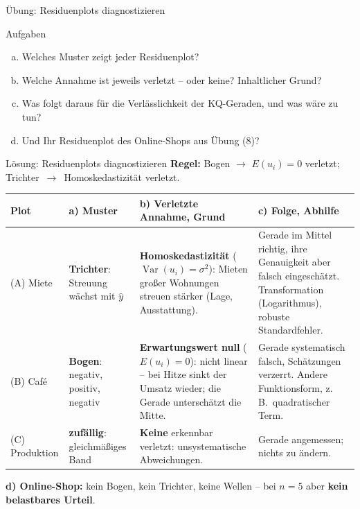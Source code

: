 \documentclass[aspectratio=169,11pt]{beamer}
\begin{document}
\begin{frame}{Übung: Residuenplots diagnostizieren}
\begin{center}
\begin{tikzpicture}
    \end{tikzpicture}
  \end{center}
  \vspace{-4pt}
  \begin{exampleblock}{Aufgaben}
    \begin{enumerate}[a)]
      \setlength{\itemsep}{0pt}
      \item Welches Muster zeigt jeder Residuenplot?
      \item Welche Annahme ist jeweils verletzt -- oder keine? Inhaltlicher Grund?
      \item Was folgt daraus für die Verlässlichkeit der KQ-Geraden, und was wäre zu tun?
      \item Und Ihr Residuenplot des Online-Shops aus Übung (8)?
    \end{enumerate}
  \end{exampleblock}
\end{frame}

\begin{frame}{Lösung: Residuenplots diagnostizieren}
  \small \textbf{Regel:} Bogen $\to$ $E(u_i) = 0$ verletzt; Trichter~$\to$~Homoskedastizität verletzt.\par
  \footnotesize
  \begin{center}
    \renewcommand{\arraystretch}{1.1}
    \begin{tabular}{@{}L{2.2cm} L{2.6cm} L{4.6cm} L{4.4cm}@{}}
      \toprule
      \textbf{Plot} & \textbf{a) Muster} & \textbf{b) Verletzte Annahme, Grund} & \textbf{c) Folge, Abhilfe} \\
      \midrule
      (A) Miete & \textbf{Trichter}: Streuung wächst mit $\hat{y}$
        & \textbf{Homoskedastizität} ($\operatorname{Var}(u_i) = \sigma^{2}$): Mieten
          großer Wohnungen streuen stärker (Lage, Ausstattung).
        & Gerade im Mittel richtig, ihre Genauigkeit aber falsch eingeschätzt.
          Transformation (Logarithmus), robuste Standardfehler. \\ \addlinespace[2pt]
      (B) Café & \textbf{Bogen}: negativ, positiv, negativ
        & \textbf{Erwartungswert null} ($E(u_i) = 0$): nicht linear -- bei Hitze sinkt
          der Umsatz wieder; die Gerade unterschätzt die Mitte.
        & Gerade systematisch falsch, Schätzungen verzerrt.
          Andere Funktionsform, z.\,B.\ quadratischer Term. \\ \addlinespace[2pt]
      (C) Produktion & \textbf{zufällig}: gleichmäßiges Band
        & \textbf{Keine} erkennbar verletzt: unsystematische Abweichungen.
        & Gerade angemessen; nichts zu ändern. \\
      \bottomrule
    \end{tabular}
  \end{center}
  \vspace{-2pt}
  \small \textbf{d) Online-Shop:} kein Bogen, kein Trichter, keine Wellen -- bei $n = 5$
  aber \textbf{kein belastbares Urteil}.
\end{frame}
\end{document}
